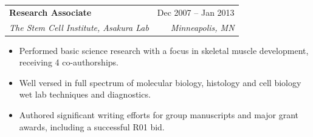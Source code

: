 \documentclass[letterpaper,11pt]{article}
\makeatletter
\newcommand{\resumeItem}[1]{
  \item\small{
    {#1 \vspace{-2pt}}
  }
}
\newcommand{\resumeSubheading}[4]{
  \vspace{-2pt}\item
    \begin{tabular*}{0.97\textwidth}[t]{l@{\extracolsep{\fill}}r}
      \textbf{#1} & #2 \\
      \textit{\small#3} & \textit{\small #4} \\
    \end{tabular*}\vspace{-7pt}
}
\newcommand{\resumeItemListStart}{\begin{itemize}}
\newcommand{\resumeItemListEnd}{\end{itemize}\vspace{-5pt}}
\makeatother
\begin{document}
%    
%    
%    

    \resumeSubheading
      {Research Associate}{Dec 2007 -- Jan 2013}
      {The Stem Cell Institute, Asakura Lab}{Minneapolis, MN}
      \resumeItemListStart
        \resumeItem{Performed basic science research with a focus in skeletal muscle development, receiving 4 co-authorships.}
        \resumeItem{Well versed in full spectrum of molecular biology, histology and cell biology wet lab techniques and diagnostics.}
        \resumeItem{Authored significant writing efforts for group manuscripts and major grant awards, including a successful R01 bid.}
      \resumeItemListEnd
\end{document}
